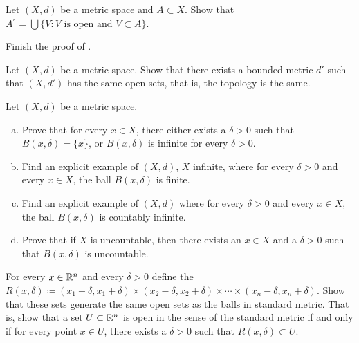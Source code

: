 \begin{exercise} \label{exercise:interiortopologic}
Let $(X,d)$ be a metric space and $A \subset X$.  Show that
$A^\circ = \bigcup \{ V : V \text{ is open and } V \subset A \}$.
\end{exercise}

\begin{exercise}
Finish the proof of .
\end{exercise}

\begin{exercise}
Let $(X,d)$ be a metric space.  Show that there exists a bounded metric
$d'$ such that $(X,d')$ has the same open sets, that is, the topology is
the same.
\end{exercise}

\begin{samepage}
\begin{exercise}
Let $(X,d)$ be a metric space.
\begin{enumerate}[a)]
\item
Prove that for every $x \in X$, there either exists a $\delta > 0$ such that
$B(x,\delta) = \{ x \}$, or $B(x,\delta)$ is infinite for every $\delta >  0$.
\item
Find an explicit example of $(X,d)$, $X$ infinite, where
for every $\delta > 0$ and
every $x \in X$, the
ball $B(x,\delta)$ is finite.
\item
Find an explicit example of $(X,d)$ where for every $\delta > 0$ and
every $x \in X$, the
ball $B(x,\delta)$ is countably infinite.
\item
Prove that if $X$ is uncountable, then there exists
an $x \in X$ and a $\delta > 0$ such that $B(x,\delta)$ is uncountable.
\end{enumerate}
\end{exercise}
\end{samepage}

\begin{exercise}
For every $x \in {\mathbb{R}}^n$ and every $\delta > 0$ define the 
$R(x,\delta) \coloneqq
(x_1-\delta,x_1+\delta) \times
(x_2-\delta,x_2+\delta) \times \cdots \times
(x_n-\delta,x_n+\delta)$.  Show that these sets generate the same open
sets as the balls in standard metric.  That is, show that a set $U \subset {\mathbb{R}}^n$
is open in the sense of the standard metric if and only if for every
point $x \in U$, there exists a $\delta > 0$ such that $R(x,\delta) \subset
U$.
\end{exercise}

